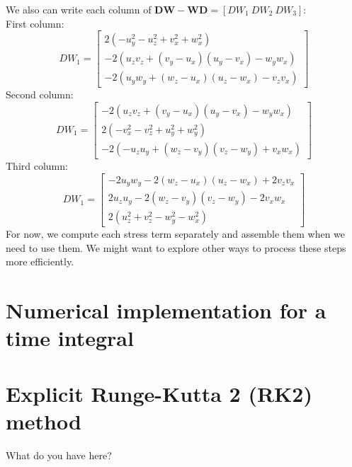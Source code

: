 We also can write each column of ${\bm{DW}} - {\bm{WD}} = \left[ DW_1 \ DW_2 \ DW_3  \right]$:
\\
First column:
\[
DW_1 = 
\begin{bmatrix}
    2 \left(- u_{y}^2-u_{z}^2  + v_{x}^2 + w_{x}^2\right)
    \\
    -2 \left(u_{z} v_{z}+\left(v_{y}-u_{x}\right) \left(u_{y}-v_{x}\right)-w_{y} w_{x}\right)
    \\
    -2 
    \left(
    u_{y} w_{y}+ \left(w_{z}-u_{x}\right) \left(u_{z}-w_{x}\right)- v_{z} v_{x}
    \right)
\end{bmatrix}
\]
Second column:
\[
DW_1 = 
\begin{bmatrix}
    -2 \left(u_{z} v_{z}+\left(v_{y}-u_{x}\right) \left(u_{y}-v_{x}\right)-w_{y} w_{x}\right)
    \\
    2 \left(- v_{x}^2 - v_{z}^2 +u_{y}^2 + w_{y}^2\right)
    \\
    -2 
    \left(
    -u_{z} u_{y}+ \left(w_{z}-v_{y}\right) \left(v_{z}-w_{y}\right)+ v_{x} w_{x}
    \right)
\end{bmatrix}
\]
Third column:
\[
DW_1 = 
\begin{bmatrix}
   -2 u_{y} w_{y}-2 \left(w_{z}-u_{x}\right) \left(u_{z}-w_{x}\right)+2 v_{z} v_{x}
   \\
   2 u_{z} u_{y}-2 \left(w_{z}-v_{y}\right) \left(v_{z}-w_{y}\right)-2 v_{x} w_{x}
   \\
   2 \left(u_{z}^2+v_{z}^2-w_{y}^2-w_{x}^2\right)
\end{bmatrix}
\]
For now, we compute each stress term separately and assemble them when we need to use them. We might want to explore other ways to process these steps more efficiently. 
\section{Numerical implementation for a time integral}
\section{Explicit Runge-Kutta 2 (RK2) method}
What do you have here?
